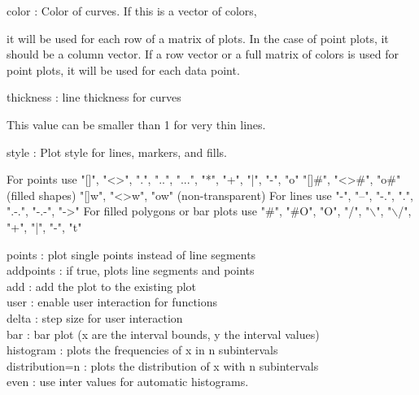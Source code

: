 \documentclass[a4paper,10pt]{article}
\begin{document}
\begin{eulernotebook}
\begin{eulercomment}
\begin{eulercomment}
\begin{eulercomment}
\begin{eulercomment}
\begin{eulercomment}
color     : Color of curves. If this is a vector of colors,\\
\end{eulercomment}
\begin{eulerttcomment}
            it will be used for each row of a matrix of plots. In the case of
            point plots, it should be a column vector. If a row vector or a
            full matrix of colors is used for point plots, it will be used for
            each data point.
\end{eulerttcomment}
\begin{eulercomment}
thickness : line thickness for curves\\
\end{eulercomment}
\begin{eulerttcomment}
            This value can be smaller than 1 for very thin lines.
\end{eulerttcomment}
\begin{eulercomment}
style     : Plot style for lines, markers, and fills.\\
\end{eulercomment}
\begin{eulerttcomment}
            For points use
            "[]", "<>", ".", "..", "...",
            "*", "+", "|", "-", "o"
            "[]#", "<>#", "o#" (filled shapes)
            "[]w", "<>w", "ow" (non-transparent)
            For lines use
            "-", "--", "-.", ".", ".-.", "-.-", "->"
            For filled polygons or bar plots use
            "#", "#O", "O", "/", "\(\backslash\)", "\(\backslash\)/",
            "+", "|", "-", "t"
\end{eulerttcomment}
\begin{eulercomment}
points    : plot single points instead of line segments\\
addpoints : if true, plots line segments and points\\
add       : add the plot to the existing plot\\
user      : enable user interaction for functions\\
delta     : step size for user interaction\\
bar       : bar plot (x are the interval bounds, y the interval values)\\
histogram : plots the frequencies of x in n subintervals\\
distribution=n : plots the distribution of x with n subintervals\\
even      : use inter values for automatic histograms.\\

\end{eulercomment}
\end{eulercomment}
\end{eulercomment}
\end{eulercomment}
\end{eulercomment}
\end{eulernotebook}
\end{document}
